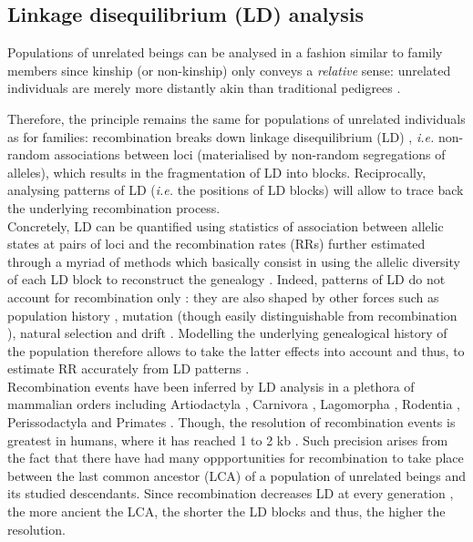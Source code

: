 \subsection{Linkage disequilibrium (LD) analysis}%
\label{chap3:LD}

Populations of unrelated beings can be analysed in a fashion similar to family members since kinship (or non-kinship) only conveys a \textit{relative} sense: unrelated individuals are merely more distantly akin than traditional pedigrees \citep{nordborg2002linkage}.

Therefore, the principle remains the same for populations of unrelated individuals as for families: recombination breaks down linkage disequilibrium (LD) \citep{lewontin1960evolutionary}, \textit{i.e.} non-random associations between loci (materialised by non-random segregations of alleles), which results in the fragmentation of LD into blocks.
Reciprocally, analysing patterns of LD (\textit{i.e.} the positions of LD blocks) will allow to trace back the underlying recombination process.\\

Concretely, LD can be quantified using statistics of association between allelic states at pairs of loci \citep{lewontin1964interaction,hill1968linkage} and the recombination rates (RRs) further estimated through a myriad of methods \citep[reviewed in][]{stumpf2003estimating} which basically consist in using the allelic diversity of each LD block to reconstruct the genealogy \citep[reviewed in][]{hinch2013landscape}.
Indeed, patterns of LD do not account for recombination only \citep[reviewed in][]{venn2013inferring}: they are also shaped by other forces such as population history \citep{golding1984sampling}, mutation \citep{calafell2001haplotype} (though easily distinguishable from recombination \citep{hudson1985statistical}), natural selection \citep{barton2000genetic} and drift \citep{charlesworth1997effects}. 
Modelling the underlying genealogical history of the population therefore allows to take the latter effects into account and thus, to estimate RR accurately from LD patterns \citep{stumpf2003estimating}.\\

Recombination events have been inferred by LD analysis in a plethora of mammalian orders including Artiodactyla \citep{farnir2000extensive,mcrae2002linkage,nsengimana2004linkage}, Carnivora \citep{menotti-raymond1999genetic,sutter2004extensive,verardi2006detecting}, Lagomorpha \citep{carneiro2011genetic}, Rodentia \citep{brunschwig2012finescale}, Perissodactyla \citep{corbin2010linkage, mccue2012high} and Primates \citep{auton2012finescale}.
Though, the resolution of recombination events is greatest in humans, where it has reached 1 to 2 kb \citep{theinternationalhapmapconsortium2007seconda, hinch2011landscape, the1000genomesprojectconsortium2015global}.
Such precision arises from the fact that there have had many oppportunities for recombination to take place between the last common ancestor (LCA) of a population of unrelated beings and its studied descendants.
Since recombination decreases LD at every generation \citep{slatkin2008linkage}, the more ancient the LCA, the shorter the LD blocks and thus, the higher the resolution.


